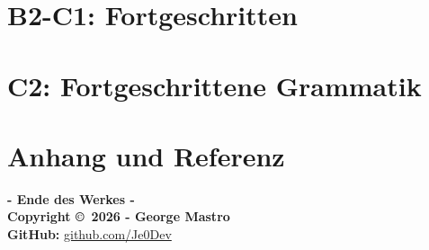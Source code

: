 \documentclass[11pt, a4paper]{book}
\begin{document}
\part{\color{b2color}\textbf{B2-C1: Fortgeschritten}}
















\part{\color{c1color}\textbf{C2: Fortgeschrittene Grammatik}}







\part{\color{c1color}\textbf{Anhang und Referenz}}




\backmatter
\begin{center}
\vspace{2cm}
\color{primary}\textbf{- Ende des Werkes -}\\[1cm]
\color{accent}\textbf{Copyright \copyright\ 2026 - George Mastro}\\[0.5cm]
\color{secondary}\textbf{GitHub:} \href{https://github.com/Je0Dev}{github.com/Je0Dev}
\end{center}
\end{document}
